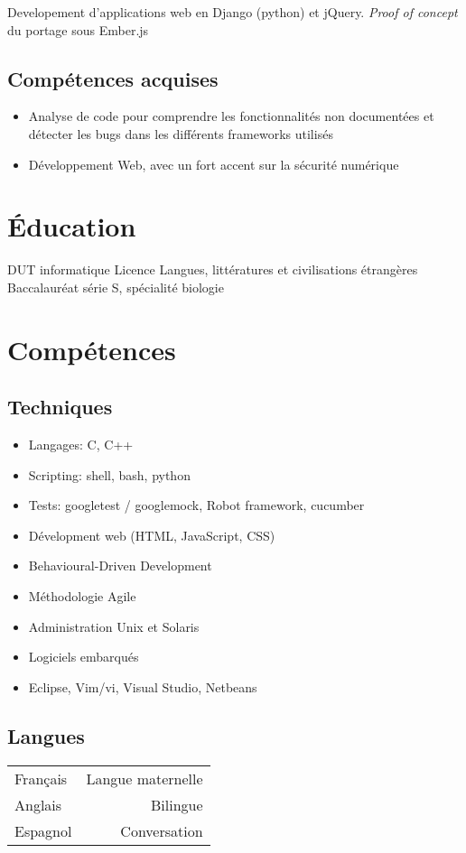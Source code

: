 \documentclass{cv}
\begin{document}
{Developement d'applications web en Django (python) et jQuery. \textit{Proof of concept} du portage sous Ember.js}
\subsection{Compétences acquises}
\begin{itemize}
    \item {Analyse de code pour comprendre les fonctionnalités non documentées et détecter les bugs dans les différents frameworks utilisés}
    \item {Développement Web, avec un fort accent sur la sécurité numérique}
\end{itemize}

\section{Éducation}
{DUT informatique}
{Licence Langues, littératures et civilisations étrangères }
{Baccalauréat série S, spécialité biologie}

\section{Compétences}
\subsection{Techniques}
\begin{itemize}
    \item {Langages: C, C++}
    \item {Scripting: shell, bash, python}
    \item {Tests: googletest / googlemock, Robot framework, cucumber}
    \item {Dévelopment web (HTML, JavaScript, CSS)}
    \item {Behavioural-Driven Development}
    \item {Méthodologie Agile}
    \item {Administration Unix et Solaris}
    \item {Logiciels embarqués}
    \item {Eclipse, Vim/vi, Visual Studio, Netbeans}
\end{itemize}

\subsection{Langues}
\begin{tabular}{L!{\VRule}R}
Français&Langue maternelle\\
Anglais&Bilingue\\
Espagnol&Conversation\\
\end{tabular}
\end{document}
